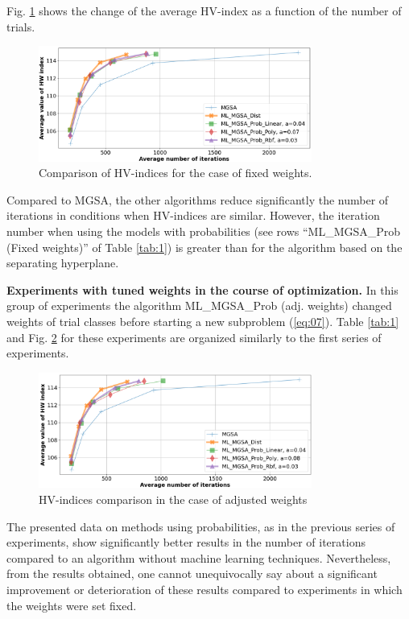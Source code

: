 \documentclass[runningheads]{llncs}
\begin{document}
Fig. \ref{fig:3} shows the change of the average HV-index as a function of the number of trials.
\begin{figure}[t!]
\centering
\includegraphics[width=0.8\textwidth]{fig3.png}
\caption{Comparison of HV-indices for the case of fixed weights.} 
\label{fig:3}
\end{figure}

Compared to MGSA, the other algorithms reduce significantly the number of iterations in conditions when HV-indices are similar. However, the iteration number when using the models with probabilities (see rows ``ML\_MGSA\_Prob (Fixed weights)'' of Table \ref{tab:1}) is greater than for the algorithm based on the separating hyperplane.

\textbf{Experiments with tuned weights in the course of optimization.} In this group of experiments the algorithm ML\_MGSA\_Prob (adj. weights) changed weights of trial classes before starting a new subproblem (\ref{eq:07}). Table \ref{tab:1} and Fig. \ref{fig:4} for these experiments are organized similarly to the first series of experiments.

\begin{figure}[t!]
\centering
\includegraphics[width=0.8\textwidth]{fig4.png}
\caption{HV-indices comparison  in the case of adjusted weights} 
\label{fig:4}
\end{figure}

The presented data on methods using probabilities, as in the previous series of experiments, show significantly better results in the number of iterations compared to an algorithm without machine learning techniques. Nevertheless, from the results obtained, one cannot unequivocally say about a significant improvement or deterioration of these results compared to experiments in which the weights were set fixed.
\end{document}
